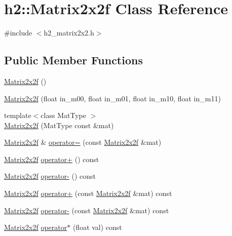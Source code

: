 \hypertarget{classh2_1_1_matrix2x2f}{\section{h2\-:\-:Matrix2x2f Class Reference}
\label{classh2_1_1_matrix2x2f}
}


{\ttfamily \#include $<$h2\-\_\-matrix2x2.\-h$>$}

\subsection*{Public Member Functions}
\begin{DoxyCompactItemize}
\item 
\hyperlink{classh2_1_1_matrix2x2f_aa11291e6c55bf85b4915d4a06bd6ecd7}{Matrix2x2f} ()
\item 
\hyperlink{classh2_1_1_matrix2x2f_af87093767819f8a73ea03b38b4eb69ab}{Matrix2x2f} (float in\-\_\-m00, float in\-\_\-m01, float in\-\_\-m10, float in\-\_\-m11)
\item 
{\footnotesize template$<$class Mat\-Type $>$ }\\\hyperlink{classh2_1_1_matrix2x2f_ad3be6fa03f611c3611b6d60651dcb437}{Matrix2x2f} (Mat\-Type const \&mat)
\item 
\hyperlink{classh2_1_1_matrix2x2f}{Matrix2x2f} \& \hyperlink{classh2_1_1_matrix2x2f_aca6deda89da1f60869ca9790135c7141}{operator=} (const \hyperlink{classh2_1_1_matrix2x2f}{Matrix2x2f} \&mat)
\item 
\hyperlink{classh2_1_1_matrix2x2f}{Matrix2x2f} \hyperlink{classh2_1_1_matrix2x2f_a3042faf9da630d1a904338ba81c653b0}{operator+} () const 
\item 
\hyperlink{classh2_1_1_matrix2x2f}{Matrix2x2f} \hyperlink{classh2_1_1_matrix2x2f_afc0161ed2dcf2add1ccaaeef6bfbc8f9}{operator-\/} () const 
\item 
\hyperlink{classh2_1_1_matrix2x2f}{Matrix2x2f} \hyperlink{classh2_1_1_matrix2x2f_a6b6eaf916f9212bbff9a4cbae0f60e62}{operator+} (const \hyperlink{classh2_1_1_matrix2x2f}{Matrix2x2f} \&mat) const 
\item 
\hyperlink{classh2_1_1_matrix2x2f}{Matrix2x2f} \hyperlink{classh2_1_1_matrix2x2f_a8bba1dd4b0da188654c2d1a6ef6fc15e}{operator-\/} (const \hyperlink{classh2_1_1_matrix2x2f}{Matrix2x2f} \&mat) const 
\item 
\hyperlink{classh2_1_1_matrix2x2f}{Matrix2x2f} \hyperlink{classh2_1_1_matrix2x2f_ab2af016d83039b13e64f359d0ddbb2eb}{operator$\ast$} (float val) const 
\item 

\end{DoxyCompactItemize}
